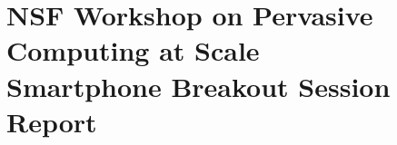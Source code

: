 

\def\thetitle{NSF Workshop on Pervasive Computing at Scale\\
Smartphone Breakout Session Report}
\def\shorttitle{NSF PeCS Smartphone Session Report}
\def\theauthors{Andrew Campbell (Dartmouth), Geoffrey Challen (SUNY Buffalo)}
\def\shortauthors{Campbell, Challen}


\pagestyle{document}
\thispagestyle{emptydocument}
\chapter{\thetitle}


